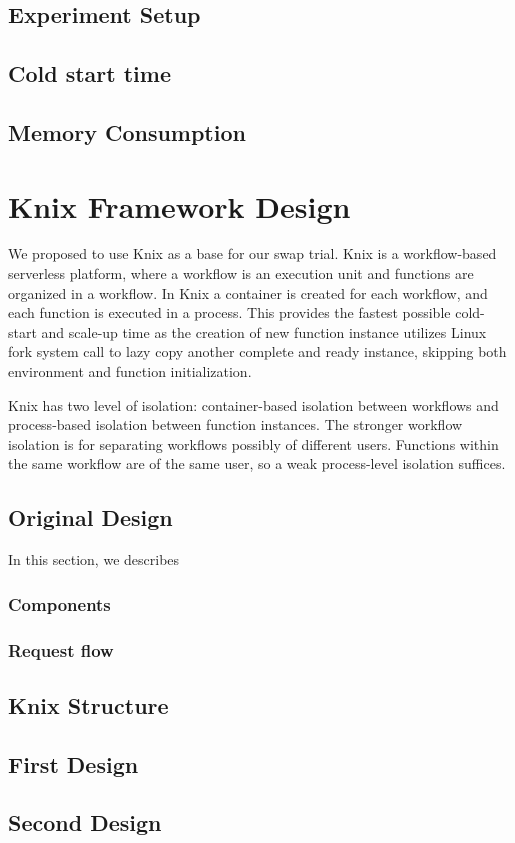 \documentclass[conference]{IEEEtran}
\begin{document}
\subsection{Experiment Setup}

\subsection{Cold start time}

\subsection{Memory Consumption}

\section{Knix Framework Design}

We proposed to use Knix as a base for our swap trial. Knix is a workflow-based serverless platform, where a workflow is an execution unit and functions are organized in a workflow. In Knix a container is created for each workflow, and each function is executed in a process. This provides the fastest possible cold-start and scale-up time as the creation of new function instance utilizes Linux fork system call to lazy copy another complete and ready instance, skipping both environment and function initialization. 

Knix has two level of isolation: container-based isolation between workflows and process-based isolation between function instances. The stronger workflow isolation is for separating workflows possibly of different users. Functions within the same workflow are of the same user, so a weak process-level isolation suffices.

\subsection{Original Design}

In this section, we describes 

\subsubsection{Components}

\subsubsection{Request flow}

\subsection{Knix Structure}

\subsection{First Design}

\subsection{Second Design}
\end{document}
